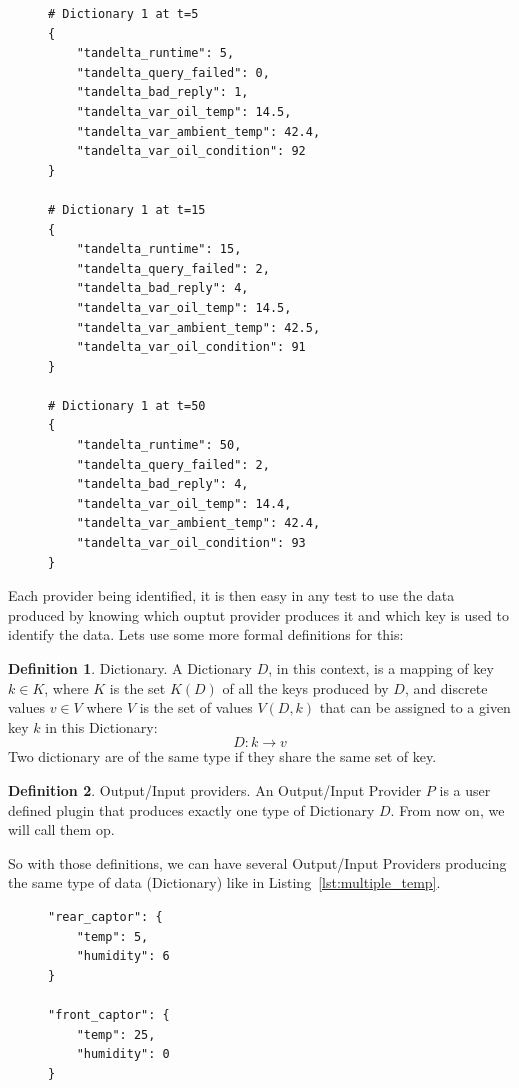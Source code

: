 \documentclass[12pt]{article}
\theoremstyle{definition}
\newtheorem{definition}{Definition}[section]
\theoremstyle{definition}
\theoremstyle{remark}
\begin{document}
\begin{figure}
\label{unit_testing_sample}
\begin{lstlisting}[caption=Example of a data dictionnary received at different time.,label={lst:dictionary_sample}]
# Dictionary 1 at t=5
{
    "tandelta_runtime": 5,
    "tandelta_query_failed": 0,
    "tandelta_bad_reply": 1,
    "tandelta_var_oil_temp": 14.5,
    "tandelta_var_ambient_temp": 42.4,
    "tandelta_var_oil_condition": 92
}

# Dictionary 1 at t=15
{
    "tandelta_runtime": 15,
    "tandelta_query_failed": 2,
    "tandelta_bad_reply": 4,
    "tandelta_var_oil_temp": 14.5,
    "tandelta_var_ambient_temp": 42.5,
    "tandelta_var_oil_condition": 91
}

# Dictionary 1 at t=50
{
    "tandelta_runtime": 50,
    "tandelta_query_failed": 2,
    "tandelta_bad_reply": 4,
    "tandelta_var_oil_temp": 14.4,
    "tandelta_var_ambient_temp": 42.4,
    "tandelta_var_oil_condition": 93
}
\end{lstlisting}
\end{figure}

Each provider being identified, it is then easy in any test to use the data produced by knowing which ouptut provider produces it and which key is used to identify the data. Lets use some more formal definitions for this:

\theoremstyle{definition}
\begin{definition}{Dictionary.} A Dictionary $D$, in this context, is a mapping of key $k \in K$, where $K$ is the set $K(D)$ of all the keys produced by $D$, and discrete values $v \in V$ where $V$ is the set of values $V(D, k)$ that can be assigned to a given key $k$ in this Dictionary:
$$D: k \to v$$
Two dictionary are of the same type if they share the same set of key.
\end{definition}

\theoremstyle{definition}
\begin{definition}{Output/Input providers.} An Output/Input Provider $P$ is a user defined plugin that produces exactly one type of Dictionary $D$. From now on, we will call them \gls{op}.
\end{definition}

So with those definitions, we can have several Output/Input Providers producing the same type of data (Dictionary) like in Listing~\ref{lst:multiple_temp}.

\begin{figure}
\label{unit_testing_sample}
\begin{lstlisting}[caption=Example of a dictionnary that contains the same keys. Each one of them being identified by the name preceding the curly bracket,label={lst:multiple_temp}]
"rear_captor": {
    "temp": 5,
    "humidity": 6
}

"front_captor": {
    "temp": 25,
    "humidity": 0
}
\end{lstlisting}
\end{figure}
\end{document}
